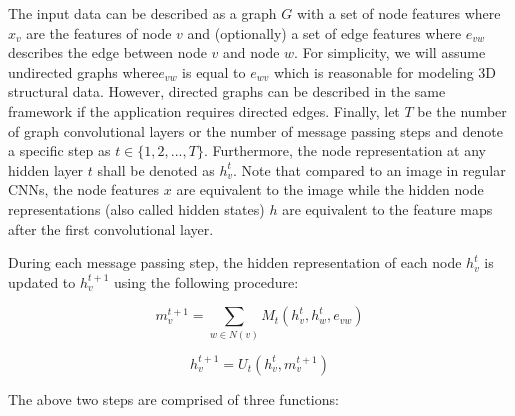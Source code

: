 The input data can be described as a graph $G$ with	a set of node features where $x_v$ are the features of node $v$ and (optionally) a set of edge features where $e_{vw}$ describes the edge between node $v$ and node $w$. For simplicity, we will assume undirected graphs where$e_{vw}$ is equal to $e_{wv}$ which is reasonable for modeling 3D structural data. However, directed graphs can be described in the same framework if the application requires directed edges. Finally, let $T$ be the number of graph convolutional layers or the number of message passing steps and denote a specific step as $t \in \{1, 2, ..., T\}$. Furthermore, the node representation at any hidden layer $t$ shall be denoted as $h_v^t$. Note that compared to an image in regular CNNs, the node features $x$ are equivalent to the image while the hidden node representations (also called hidden states) $h$ are equivalent to the feature maps after the first convolutional layer.

During each message passing step, the hidden representation of each node $h_v^t$ is updated to $h_v^{t+1}$ using the following procedure:

\begin{equation}
m_v^{t+1} = \sum_{w \in N(v)} M_t(h_v^t, h_w^t, e_{vw})
\end{equation}
\label{eq:message-function}

\begin{equation}
h_v^{t+1} = U_t(h_v^t, m_v^{t+1})
\end{equation}
\label{eq:update-function}

The above two steps are comprised of three functions:

